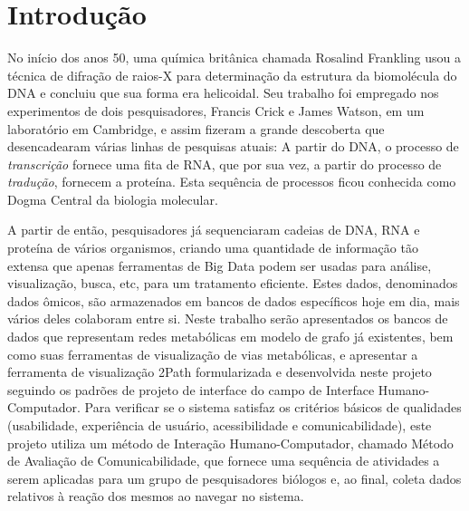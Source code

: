 \chapter{Introdução}


\indent No início dos anos 50, uma química britânica chamada Rosalind Frankling usou a técnica de difração de raios-X para determinação da estrutura da biomolécula do DNA e concluiu que sua forma era helicoidal. Seu trabalho foi empregado nos experimentos de dois pesquisadores, Francis Crick e James Watson, em um laboratório em Cambridge, e assim fizeram a grande descoberta que desencadearam várias linhas de pesquisas atuais: A partir do DNA, o processo de \textit{transcrição} fornece uma fita de RNA, que por sua vez, a partir do processo de \textit{tradução}, fornecem a proteína. Esta sequência de processos ficou conhecida como Dogma Central da biologia molecular.


\indent A partir de então, pesquisadores já sequenciaram cadeias de DNA, RNA e proteína de vários organismos, criando uma quantidade de informação tão extensa que apenas ferramentas de Big Data podem ser usadas para análise, visualização, busca, etc, para um tratamento eficiente. Estes dados, denominados dados ômicos, são armazenados em bancos de dados específicos hoje em dia, mais vários deles colaboram entre si. Neste trabalho serão apresentados os bancos de dados que representam redes metabólicas em modelo de grafo já existentes, bem como suas ferramentas de visualização de vias metabólicas, e apresentar a ferramenta de visualização 2Path formularizada e desenvolvida neste projeto seguindo os padrões de projeto de interface do campo de Interface Humano-Computador. Para verificar se o sistema satisfaz os critérios básicos de qualidades (usabilidade, experiência de usuário, acessibilidade e comunicabilidade), este projeto utiliza um método de Interação Humano-Computador, chamado Método de Avaliação de Comunicabilidade, que fornece uma sequência de atividades a serem aplicadas para um grupo de pesquisadores biólogos e, ao final, coleta dados relativos à reação dos mesmos ao navegar no sistema.






